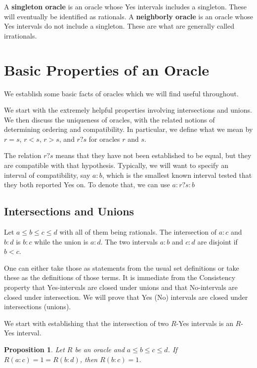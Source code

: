 \documentclass[12pt]{article}
\newtheorem{proposition}{Proposition}[subsection]
\theoremstyle{remark}
\begin{document}
A \textbf{singleton oracle }is an oracle whose Yes intervals includes a singleton. These will eventually be identified as rationals. A \textbf{neighborly oracle} is an oracle whose Yes intervals do not include a singleton. These are what are generally called irrationals. 



\section{Basic Properties of an Oracle}

We establish some basic facts of oracles which we will find useful throughout. 

We start with the extremely helpful properties involving intersections and unions. We then discuss the uniqueness of oracles, with the related notions of determining ordering and compatibility. In particular, we define what we mean by $r = s$, $r<s$, $r>s$, and $r?s$ for oracles $r$ and $s$. 


The relation $r?s$ means that they have not been established to be equal, but they are compatible with that hypothesis. Typically, we will want to specify an interval of compatibility, say $a:b$, which is the smallest known interval tested that they both reported Yes on. To denote that, we can use $a:r?s:b$ 

\subsection{Intersections and Unions}

Let $a \leq b \leq c \leq d$ with all of them being rationals. The intersection of $a:c$ and $b:d$ is $b:c$ while the union is $a:d$. The two intervals $a:b$ and $c:d$ are disjoint if $b < c$. 

One can either take those as statements from the usual set definitions or take these as the definitions of those terms. It is immediate from the Consistency property that Yes-intervals are closed under unions and that No-intervals are closed under intersection. We will prove that Yes (No) intervals are closed under intersections (unions). 

We start with establishing that the intersection of two $R$-Yes intervals is an $R$-Yes interval.

\begin{proposition}\label{pr:inter}
Let $R$ be an oracle and $a \leq b \leq c \leq d$. If $R(a:c) = 1 = R(b:d)$, then $R(b:c) = 1$.
\end{proposition}
\end{document}
